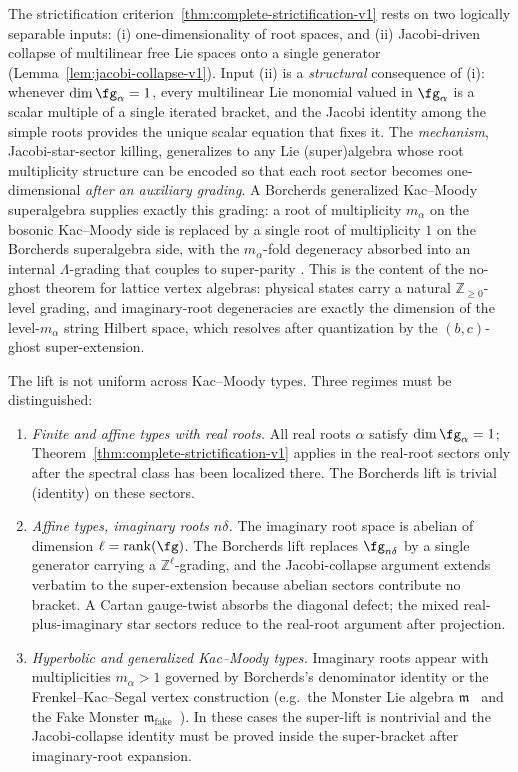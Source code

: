 \begin{remark}
\label{rem:borcherds-lift-scope}
The strictification criterion~\ref{thm:complete-strictification-v1}
rests on two logically separable inputs: (i) one-dimensionality of
root spaces, and (ii) Jacobi-driven collapse of multilinear free Lie
spaces onto a single generator
(Lemma~\ref{lem:jacobi-collapse-v1}). Input (ii) is a \emph{structural}
consequence of (i): whenever
$\dim\fg_\alpha=1$, every multilinear Lie monomial valued in
$\fg_\alpha$ is a scalar multiple of a single iterated bracket, and the
Jacobi identity among the simple roots provides the unique scalar
equation that fixes it. The \emph{mechanism}, Jacobi-star-sector
killing, generalizes to any Lie (super)algebra whose root multiplicity
structure can be encoded so that each root sector becomes
one-dimensional \emph{after an auxiliary grading}. A Borcherds
generalized Kac--Moody superalgebra supplies exactly this grading: a
root of multiplicity $m_\alpha$ on the bosonic Kac--Moody side is
replaced by a single root of multiplicity $1$ on the Borcherds
superalgebra side, with the $m_\alpha$-fold degeneracy absorbed into an
internal $\Lambda$-grading that couples to super-parity
\cite{Borcherds1988,Borcherds1992}. This is the content of the
no-ghost theorem for lattice vertex algebras: physical states carry a
natural $\mathbb{Z}_{\ge 0}$-level grading, and imaginary-root
degeneracies are exactly the dimension of the level-$m_\alpha$ string
Hilbert space, which resolves after quantization by the
$(b,c)$-ghost super-extension.

The lift is not uniform across Kac--Moody types. Three regimes must be
distinguished:
\begin{enumerate}
\item \emph{Finite and affine types with real roots.} All real roots
$\alpha$ satisfy $\dim\fg_\alpha=1$;
Theorem~\ref{thm:complete-strictification-v1} applies in the
real-root sectors only after the spectral class has been localized
there. The Borcherds lift is trivial (identity) on these
sectors.
\item \emph{Affine types, imaginary roots $n\delta$.} The imaginary
root space is abelian of dimension $\ell=\operatorname{rank}(\fg)$. The
Borcherds lift replaces $\fg_{n\delta}$ by a single generator carrying
a $\mathbb{Z}^\ell$-grading, and the Jacobi-collapse argument extends
verbatim to the super-extension because abelian sectors contribute no
bracket. A Cartan gauge-twist absorbs the diagonal defect; the mixed
real-plus-imaginary star sectors reduce to the real-root argument
after projection.
\item \emph{Hyperbolic and generalized Kac--Moody types.} Imaginary
roots appear with multiplicities $m_\alpha>1$ governed by
Borcherds's denominator identity or the Frenkel--Kac--Segal vertex
construction (e.g.\ the Monster Lie algebra
$\mathfrak{m}$~\cite{Borcherds1992} and the Fake Monster
$\mathfrak{m}_{\mathrm{fake}}$~\cite{Borcherds1990}). In these cases
the super-lift is nontrivial and the Jacobi-collapse identity must
be proved inside the super-bracket after imaginary-root expansion.
\end{enumerate}


\end{remark}

